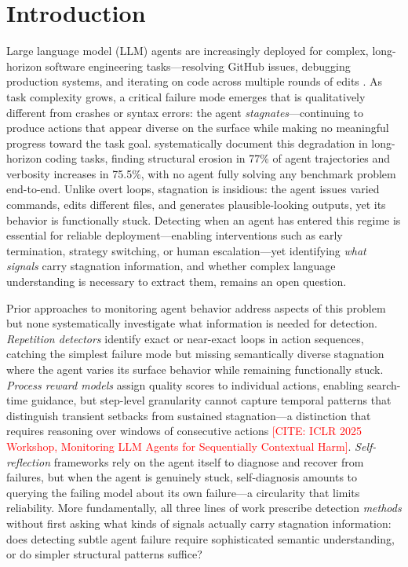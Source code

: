 \section{Introduction}
\label{sec:introduction}

Large language model (LLM) agents are increasingly deployed for complex, long-horizon software engineering tasks---resolving GitHub issues, debugging production systems, and iterating on code across multiple rounds of edits \citep{jimenez2024swebench,yang2024sweagent,wang2025openhands}.
As task complexity grows, a critical failure mode emerges that is qualitatively different from crashes or syntax errors: the agent \emph{stagnates}---continuing to produce actions that appear diverse on the surface while making no meaningful progress toward the task goal.
\citet{orlanski2026slopcodebench} systematically document this degradation in long-horizon coding tasks, finding structural erosion in 77\% of agent trajectories and verbosity increases in 75.5\%, with no agent fully solving any benchmark problem end-to-end.
Unlike overt loops, stagnation is insidious: the agent issues varied commands, edits different files, and generates plausible-looking outputs, yet its behavior is functionally stuck.
Detecting when an agent has entered this regime is essential for reliable deployment---enabling interventions such as early termination, strategy switching, or human escalation---yet identifying \emph{what signals} carry stagnation information, and whether complex language understanding is necessary to extract them, remains an open question.

Prior approaches to monitoring agent behavior address aspects of this problem but none systematically investigate what information is needed for detection.
\emph{Repetition detectors} identify exact or near-exact loops in action sequences, catching the simplest failure mode but missing semantically diverse stagnation where the agent varies its surface behavior while remaining functionally stuck.
\emph{Process reward models} \citep{xi2025agentprm} assign quality scores to individual actions, enabling search-time guidance, but step-level granularity cannot capture temporal patterns that distinguish transient setbacks from sustained stagnation---a distinction that requires reasoning over windows of consecutive actions \textcolor{red}{[CITE: ICLR 2025 Workshop, Monitoring LLM Agents for Sequentially Contextual Harm]}.
\emph{Self-reflection} frameworks \citep{shinn2023reflexion,yao2023tot,zhou2024lats} rely on the agent itself to diagnose and recover from failures, but when the agent is genuinely stuck, self-diagnosis amounts to querying the failing model about its own failure---a circularity that limits reliability.
More fundamentally, all three lines of work prescribe detection \emph{methods} without first asking what kinds of signals actually carry stagnation information: does detecting subtle agent failure require sophisticated semantic understanding, or do simpler structural patterns suffice?

